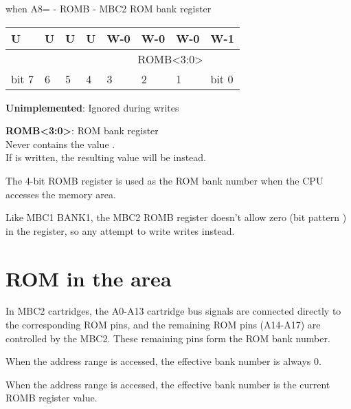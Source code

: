 \begin{register}[H]
  \caption{ when A8= - ROMB - MBC2 ROM bank register}
  {
    \ttfamily
    \begin{tabularx}{\textwidth}{|X|X|X|X|X|X|X|X|}
      \hline
      U & U & U & U & W-0 & W-0 & W-0 & W-1 \\
      \hline
      \cellcolor{LightGray} & \cellcolor{LightGray} & \cellcolor{LightGray} & \cellcolor{LightGray} & \multicolumn{4}{c|}{ROMB<3:0>} \\
      \hline
      bit 7 & 6 & 5 & 4 & 3 & 2 & 1 & bit 0 \\
      \hline
    \end{tabularx}
  }

  \begin{description}[leftmargin=5em, style=nextline]
    \item[bit 7-4]
      \textbf{Unimplemented}: Ignored during writes
    \item[bit 3-0]
      \textbf{ROMB<3:0>}: ROM bank register \\
      Never contains the value . \\
      If  is written, the resulting value will be  instead.
  \end{description}
\end{register}

The 4-bit ROMB register is used as the ROM bank number when the CPU accesses
the  memory area.

Like MBC1 BANK1, the MBC2 ROMB register doesn't allow zero (bit pattern
) in the register, so any attempt to write  writes
 instead.

\section{ROM in the  area}

In MBC2 cartridges, the A0-A13 cartridge bus signals are connected directly to
the corresponding ROM pins, and the remaining ROM pins (A14-A17) are controlled
by the MBC2. These remaining pins form the ROM bank number.

When the  address range is accessed, the effective bank
number is always 0.

When the  address range is accessed, the effective bank
number is the current ROMB register value.

